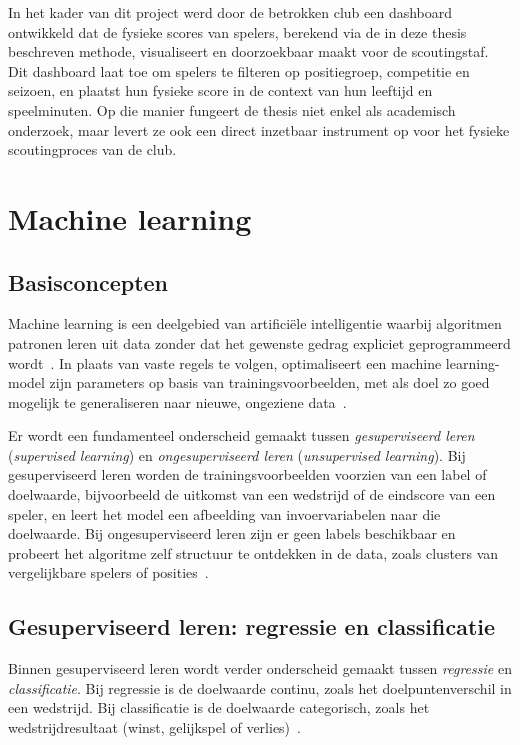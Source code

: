 In het kader van dit project werd door de betrokken club een dashboard ontwikkeld dat de fysieke scores van spelers, berekend via de in deze thesis beschreven methode, visualiseert en doorzoekbaar maakt voor de scoutingstaf. Dit dashboard laat toe om spelers te filteren op positiegroep, competitie en seizoen, en plaatst hun fysieke score in de context van hun leeftijd en speelminuten. Op die manier fungeert de thesis niet enkel als academisch onderzoek, maar levert ze ook een direct inzetbaar instrument op voor het fysieke scoutingproces van de club.

\section{Machine learning}
 
\subsection{Basisconcepten}
 
Machine learning is een deelgebied van artificiële intelligentie waarbij algoritmen patronen leren uit data zonder dat het gewenste gedrag expliciet geprogrammeerd wordt~\autocite{Pietraszewski2025_AI_SportsAnalytics}. In plaats van vaste regels te volgen, optimaliseert een machine learning-model zijn parameters op basis van trainingsvoorbeelden, met als doel zo goed mogelijk te generaliseren naar nieuwe, ongeziene data~\autocite{geron-2023}.
 
Er wordt een fundamenteel onderscheid gemaakt tussen \textit{gesuperviseerd leren} (\textit{supervised learning}) en \textit{ongesuperviseerd leren} (\textit{unsupervised learning}). Bij gesuperviseerd leren worden de trainingsvoorbeelden voorzien van een label of doelwaarde, bijvoorbeeld de uitkomst van een wedstrijd of de eindscore van een speler, en leert het model een afbeelding van invoervariabelen naar die doelwaarde. Bij ongesuperviseerd leren zijn er geen labels beschikbaar en probeert het algoritme zelf structuur te ontdekken in de data, zoals clusters van vergelijkbare spelers of posities~\autocite{Rico-González2023,geron-2023}.
 
\subsection{Gesuperviseerd leren: regressie en classificatie}
 
Binnen gesuperviseerd leren wordt verder onderscheid gemaakt tussen \textit{regressie} en \textit{classificatie}. Bij regressie is de doelwaarde continu, zoals het doelpuntenverschil in een wedstrijd. Bij classificatie is de doelwaarde categorisch, zoals het wedstrijdresultaat (winst, gelijkspel of verlies)~\autocite{geron-2023}.
 
